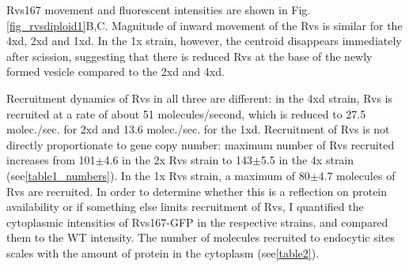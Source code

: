 \newpage
Rvs167 movement and fluorescent intensities are shown in Fig.\ref{fig_rvsdiploid1}B,C. 
Magnitude of inward movement of the Rvs is similar for the 4xd, 2xd and 1xd. In the 1x strain, however, the centroid disappears immediately after scission, suggesting that there is reduced Rvs at the base of the newly formed vesicle compared to the 2xd and 4xd.

	\vspace{5mm}
Recruitment dynamics of Rvs in all three are different: in the 4xd strain, Rvs is recruited at a rate of about 51 molecules/second, which is reduced to 27.5 molec./sec. for 2xd and 13.6 molec./sec. for the 1xd. Recruitment of Rvs is not directly proportionate to gene copy number: maximum number of Rvs recruited increases from 101$\pm$4.6 in the 2x Rvs strain to 143$\pm$5.5 in the 4x strain (see\ref{table1_numbers}). In the 1x Rvs strain, a maximum of 80$\pm$4.7 molecules of Rvs are recruited. In order to determine whether this is a reflection on protein availability or if something else limits recruitment of Rvs, I quantified the cytoplasmic intensities of Rvs167-GFP in the respective strains, and compared them to the WT intensity. The number of molecules recruited to endocytic sites scales with the amount of protein in the cytoplasm (see\ref{table2}).  



